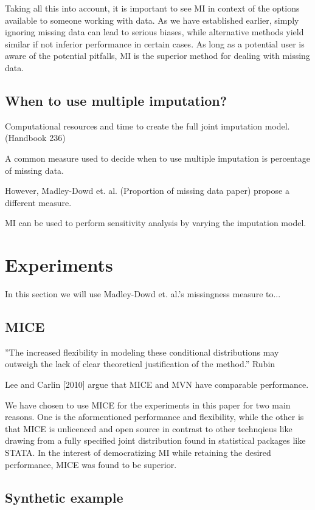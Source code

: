 \documentclass{article}
\begin{document}
	Taking all this into account, it is important to see MI in context of the options available to someone working with data. As we have established earlier, simply ignoring missing data can lead  to serious biases, while alternative methods yield similar if not inferior performance in certain cases. As long as a potential user is aware of the potential pitfalls, MI is the superior method for dealing with missing data.
	
	
	\subsection{When to use multiple imputation?}
	Computational resources and time to create the full joint imputation model. (Handbook 236)
	
	A common measure used to decide when to use multiple imputation is percentage of missing data.
	
	However, Madley-Dowd et. al. (Proportion of missing data paper) propose a different measure.
	
	MI can be used to perform sensitivity analysis by varying the imputation model.
	
	\section{Experiments}
	In this section we will use Madley-Dowd et. al.'s missingness measure to...
	
	\subsection{MICE}
	''The
	increased flexibility in modeling these conditional distributions may outweigh
	the lack of clear theoretical justification of the method.'' Rubin
	
	Lee and Carlin  [2010] argue that MICE and MVN have comparable performance.
	
	We have chosen to use MICE for the experiments in this paper for two main reasons. One is the aformentioned performance and flexibility, while the other is that MICE is unlicenced and open source in contrast to other technqieus like drawing from a fully specified joint distribution found in statistical packages like STATA. In the interest of democratizing MI while retaining the desired performance, MICE was found to be superior.
	
	\subsection{Synthetic example}
	
\end{document}
